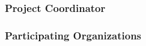 \documentclass[
  11pt,
]{article}
\begin{document}
\hypertarget{project-coordinator}{%
\subsubsection{Project Coordinator}\label{project-coordinator}}

\hypertarget{participating-organizations}{%
\subsubsection{Participating
Organizations}\label{participating-organizations}}

\providecommand{\docline}[3]{\noalign{\global\setlength{\arrayrulewidth}{#1}}\arrayrulecolor[HTML]{#2}\cline{#3}}

\setlength{\tabcolsep}{2pt}

\renewcommand*{\arraystretch}{1.5}
\end{document}
